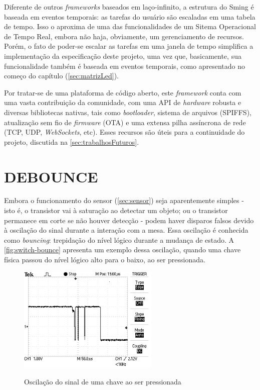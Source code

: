 Diferente de outros \emph{frameworks} baseados em laço-infinito, a estrutura do Sming é baseada em eventos temporais: as tarefas do usuário são escaladas em uma tabela de tempo. Isso o aproxima de uma das funcionalidades de um Sitema Operacional de Tempo Real, embora não haja, obviamente, um gerenciamento de recursos. Porém, o fato de poder-se escalar as tarefas em uma janela de tempo simplifica a implementação da especificação deste projeto, uma vez que, basicamente, sua funcionalidade também é baseada em eventos temporais, como apresentado no começo do capítulo (\autoref{sec:matrizLed}).

Por tratar-se de uma plataforma de código aberto, este \emph{framework} conta com uma vasta contribuição da comunidade, com uma API de \emph{hardware} robusta e diversas bibliotecas nativas, tais como \emph{bootloader}, sistema de arquivos (SPIFFS), atualização sem fio de \emph{firmware} (OTA) e uma extensa pilha assíncrona de rede (TCP, UDP, \emph{WebSockets}, etc). Esses recursos são úteis para a continuidade do projeto, discutida na \autoref{sec:trabalhosFuturos}.



\section{DEBOUNCE}
\label{sec:debounce}

Embora o funcionamento do sensor (\autoref{sec:sensor}) seja aparentemente simples - isto é, o transistor vai à saturação ao detectar um objeto; ou o transistor permanece em corte se não houver detecção - podem haver disparos falsos devido à oscilação do sinal durante a interação com a mesa. Essa oscilação é conhecida como \emph{bouncing}: trepidação do nível lógico durante a mudança de estado. A \autoref{fig:switch-bounce} apresenta um exemplo dessa oscilação, quando uma chave física passou do nível lógico alto para o baixo, ao ser pressionada.

\begin{figure}[H]
    \centering
    \caption{Oscilação do sinal de uma chave ao ser pressionada}
    \includegraphics[width=0.6\textwidth]{./dados/figuras/bounce}
    \label{fig:switch-bounce}
\end{figure}

